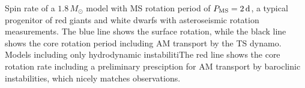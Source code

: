  \label{fig:MRI1p8rot} Spin rate of a $1.8 \, M_\odot$ model with MS rotation period of $P_{\rm MS} = 2 \, {\rm d}$, a typical progenitor of red giants and white dwarfs with asteroseismic rotation measurements. The blue line shows the surface rotation, while the black line shows the core rotation period including AM transport by the TS dynamo. Models including only hydrodynamic instabilitiThe red line shows the core rotation rate including a preliminary presciption for AM transport by baroclinic instabilities, which nicely matches observations.